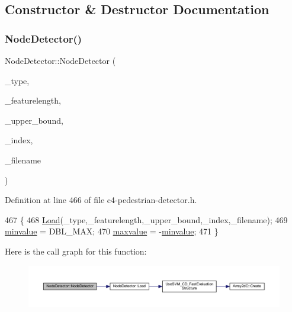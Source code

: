 \subsection{Constructor \& Destructor Documentation}
\mbox{\label{class_node_detector_af6107c5f4f78e4d60a720733e6fbcb5e}} 
\subsubsection{\texorpdfstring{Node\+Detector()}{NodeDetector()}}
{\footnotesize\ttfamily Node\+Detector\+::\+Node\+Detector (\begin{DoxyParamCaption}\item[{const \mbox{\hyperlink{class_node_detector_a7188c48dfe6b88b3b7f47c599c4832bd}{Node\+Type}}}]{\+\_\+type,  }\item[{const int}]{\+\_\+featurelength,  }\item[{const int}]{\+\_\+upper\+\_\+bound,  }\item[{const int}]{\+\_\+index,  }\item[{const char $\ast$}]{\+\_\+filename }\end{DoxyParamCaption})\hspace{0.3cm}{\ttfamily [inline]}}



Definition at line 466 of file c4-\/pedestrian-\/detector.\+h.


\begin{DoxyCode}
467     \{
468         \mbox{\hyperlink{class_node_detector_a8f28d4e33d23c0391511f795615b45d2}{Load}}(\_type,\_featurelength,\_upper\_bound,\_index,\_filename);
469         \mbox{\hyperlink{class_node_detector_ab069f95bc20f00754a15c62c932b7e77}{minvalue}} = DBL\_MAX;
470         \mbox{\hyperlink{class_node_detector_adb33cb202a422de76467e72f1b146610}{maxvalue}} = -\mbox{\hyperlink{class_node_detector_ab069f95bc20f00754a15c62c932b7e77}{minvalue}};
471     \}
\end{DoxyCode}
Here is the call graph for this function\+:\nopagebreak
\begin{figure}[H]
\begin{center}
\leavevmode
\includegraphics[width=350pt]{class_node_detector_af6107c5f4f78e4d60a720733e6fbcb5e_cgraph}
\end{center}
\end{figure}
\mbox{\label{class_node_detector_a3f8e6eedfce05ea8953ff1a41413ccfa}} 
